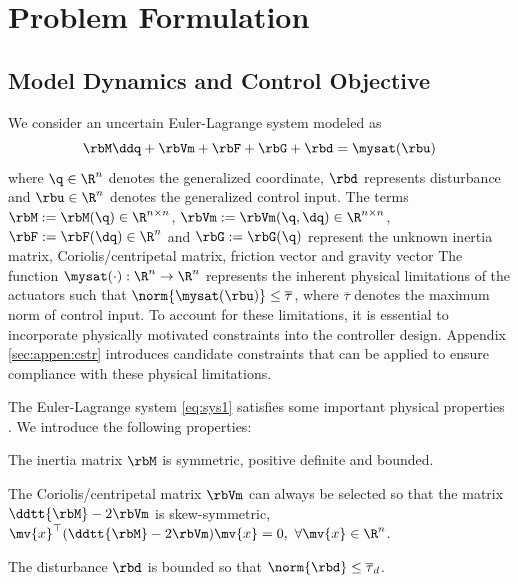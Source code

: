 \documentclass[lettersize,journal]{IEEEtran}
\begin{document}
\section{Problem Formulation}\label{sec:Problem Formulation}

\subsection{Model Dynamics and Control Objective}

We consider an uncertain Euler-Lagrange system modeled as
\begin{equation}
    \rbM\ddq + \rbVm + \rbF + \rbG + \rbd
    =
    \mysat(\rbu)
    \label{eq:sys1}
\end{equation}
where $\q\in \R^n$ denotes the generalized coordinate, $\rbd$ represents disturbance and $\rbu\in\R^n$ denotes the generalized control input. 
The terms $\rbM:=\rbM(\q)\in\R^{n\times n}$, $\rbVm:=\rbVm(\q,\dq)\in\R^{n\times n}$, $\rbF:=\rbF(\dq)\in\R^{n}$ and $\rbG:=\rbG(\q)$ represent the unknown inertia matrix, Coriolis/centripetal matrix, friction vector and gravity vector
The function $\mysat(\cdot):\R^n\to\R^n$ represents the inherent physical limitations of the actuators such that $\norm{\mysat(\rbu)}\le \overline\tau$, where $\overline\tau$ denotes the maximum norm of control input.
To account for these limitations, it is essential to incorporate physically motivated constraints into the controller design.
Appendix \ref{sec:appen:cstr} introduces candidate constraints that can be applied to ensure compliance with these physical limitations.

The Euler-Lagrange system \eqref{eq:sys1} satisfies some important physical properties \cite[Chap. 3 Tab. 3.2.1]{Lewis:1998aa}.
We introduce the following properties:
\begin{prop} 
    The inertia matrix $\rbM$ is symmetric, positive definite and bounded.
    \label{prop:M}
\end{prop}

\begin{prop} 
    The Coriolis/centripetal matrix $\rbVm$ can always be selected so that the matrix $\ddtt{\rbM}-2\rbVm$ is skew-symmetric, \ie $\mv{x}^\top(\ddtt{\rbM}-2\rbVm)\mv{x}=0,\ \forall \mv{x}\in\R^n$.
    \label{prop:skew}
\end{prop}

\begin{prop}
    The disturbance $\rbd$ is bounded so that $\norm{\rbd}\le \overline\tau_d$.
    \label{prop:dis_bound}
\end{prop}
\end{document}
